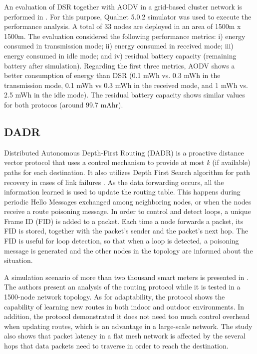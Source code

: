 \documentclass[10pt,twocolumn,twoside,submit]{JCNtran}
\begin{document}
An evaluation of DSR together with AODV in a grid-based cluster network is performed in \cite{PratibhaKevre2014}. For this purpose, Qualnet 5.0.2 simulator was used to execute the performance analysis. A total of 33 nodes are deployed in an area of 1500m x 1500m. The evaluation considered the following performance metrics: i) energy consumed in transmission mode; ii) energy consumed in received mode; iii)  energy consumed in idle mode; and iv) residual battery capacity (remaining battery after simulation). Regarding the first three metrics, AODV shows a better consumption of energy than DSR (0.1 mWh vs. 0.3 mWh in the transmission mode, 0.1 mWh vs 0.3 mWh in the received mode, and 1 mWh vs. 2.5 mWh in the idle mode).  The residual battery capacity shows similar values for both protocos (around 99.7 mAhr). 

\subsection{DADR}\label{dadr}

Distributed Autonomous Depth-First Routing (DADR) \cite{Iwao2009} is a proactive distance vector protocol that uses a control mechanism to provide at most \textit{k} (if available) paths for each destination. It also utilizes Depth First Search algorithm for path recovery in cases of link failures \cite{Cespedes2012}. As the data forwarding occurs, all the information learned is used to update the routing table. This happens during periodic Hello Messages exchanged among neighboring nodes, or when the nodes receive a route poisoning message. In order to control and detect loops, a unique Frame ID (FID) is added to a packet. Each time a node forwards a packet, its FID is stored, together with the packet's sender and the packet's next hop. The FID is useful for loop detection, so that when a loop is detected, a poisoning message is generated and the other nodes in the topology are informed about the situation.

A simulation scenario of more than two thousand smart meters is presented in \cite{Iwao2010}. The authors present an analysis of the routing protocol while it is tested in a 1500-node network topology. As for adaptability, the protocol shows the capability of learning new routes in both indoor and outdoor environments. In addition, the protocol demonstrated it does not need too much control overhead when updating routes, which is an advantage in a large-scale network. The study also shows that packet latency in a flat mesh network is affected by the several hops that data packets need to traverse in order to reach the destination.
\end{document}
